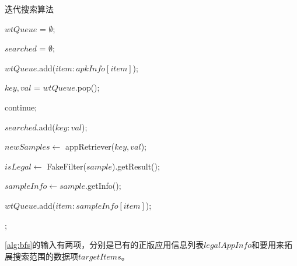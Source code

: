 \begin{algorithm}[!ht]
	\tablewuhao
	\caption{迭代搜索算法}
	\label{alg:bfs}

	 {

        $wtQueue$ = $\emptyset$;

        $searched$ = $\emptyset$;

         {

             {

                $wtQueue$.add(${item: apkInfo[item]}$);

            }

        }

    	 {

    		$key, val$ = $wtQueue$.pop();

    		 {continue;}

    		$searched$.add(${key: val}$);

    		$newSamples \gets$ appRetriever($key, val$);

    		 {

                $isLegal \gets $ FakeFilter($sample$).getResult();

    			 {

    				$sampleInfo \gets sample$.getInfo();

    				 {

    					$wtQueue$.add(${item: sampleInfo[item]}$);

    				}

    			}

    		}

    	}

    ;

    }

\end{algorithm}

\autoref{alg:bfs}的输入有两项，分别是已有的正版应用信息列表$legalAppInfo$和要用来拓展搜索范围的数据项$targetItems$。

